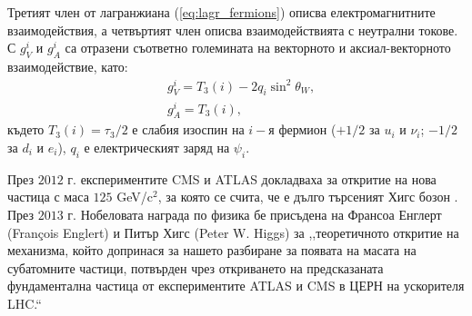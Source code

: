 \par Третият член от лагранжиана (\ref{eq:lagr_fermions}) описва електромагнитните взаимодействия, а четвъртият член описва взаимодействията с неутрални токове. С $g_V^i$ и $g_A^i$ са отразени съответно големината на векторното и аксиал-векторното взаимодействие, като:
\begin{align}
& g_V^i = T_3(i)-2q_i \sin^2\theta_W,\\
& g_A^i = T_3(i),
\end{align} 
където $T_3(i)=\tau_3/2$ е слабия изоспин на $i-$я фермион ($+1/2$ за $u_i$ и $\nu_i$; $-1/2$ за $d_i$ и $e_i$), $q_i$ е електрическият заряд на $\psi_i$.
\par През $2012$ г. експериментите CMS и ATLAS докладваха за откритие на нова частица с маса $125$ GeV/c$^2$, за която се счита, че е дълго търсеният Хигс бозон \cite{HiggsBoson, HiggsBoson1}. През $2013$ г. Нобеловата награда по физика бе присъдена на Франсоа Енглерт (François Englert) и Питър Хигс (Peter W. Higgs) за ,,теоретичното откритие на механизма, който допринася за нашето разбиране за появата на масата на субатомните частици, потвърден чрез откриването на предсказаната фундаментална частица от експериментите ATLAS и CMS в ЦЕРН на ускорителя LHC.``


